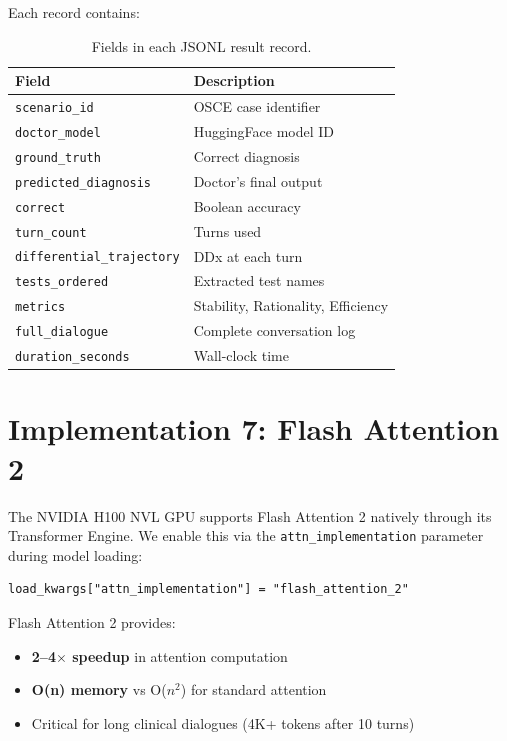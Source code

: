 \documentclass[12pt, a4paper]{article}
\begin{document}
Each record contains:

\begin{table}[H]
\centering
\caption{Fields in each JSONL result record.}
\label{tab:jsonl_fields}
\begin{tabular}{ll}
\toprule
\textbf{Field} & \textbf{Description} \\
\midrule
\texttt{scenario\_id}            & OSCE case identifier \\
\texttt{doctor\_model}           & HuggingFace model ID \\
\texttt{ground\_truth}           & Correct diagnosis \\
\texttt{predicted\_diagnosis}    & Doctor's final output \\
\texttt{correct}                 & Boolean accuracy \\
\texttt{turn\_count}             & Turns used \\
\texttt{differential\_trajectory} & DDx at each turn \\
\texttt{tests\_ordered}          & Extracted test names \\
\texttt{metrics}                 & Stability, Rationality, Efficiency \\
\texttt{full\_dialogue}          & Complete conversation log \\
\texttt{duration\_seconds}       & Wall-clock time \\
\bottomrule
\end{tabular}
\end{table}

\section{Implementation 7: Flash Attention 2}
\label{sec:flash_attn}

The NVIDIA H100 NVL GPU supports Flash Attention 2 natively through its
Transformer Engine. We enable this via the \texttt{attn\_implementation}
parameter during model loading:

\begin{lstlisting}
load_kwargs["attn_implementation"] = "flash_attention_2"
\end{lstlisting}

Flash Attention 2 provides:
\begin{itemize}
    \item \textbf{2--4$\times$ speedup} in attention computation
    \item \textbf{O(n) memory} vs O($n^2$) for standard attention
    \item Critical for long clinical dialogues (4K+ tokens after 10 turns)
\end{itemize}
\end{document}
